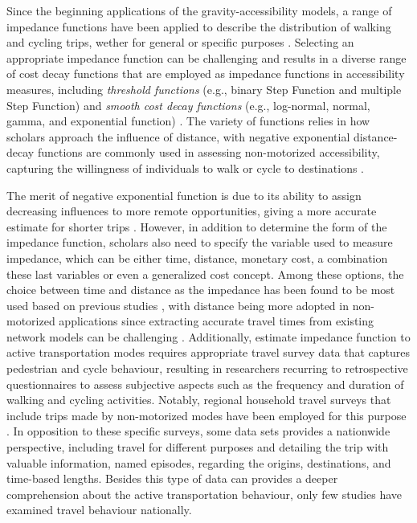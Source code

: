 \documentclass[preprint, 3p,
authoryear]{elsarticle} %
\begin{document}
Since the beginning applications of the gravity-accessibility models, a
range of impedance functions have been applied to describe the
distribution of walking and cycling trips, wether for general or
specific purposes
\citep{iacono2008access, iacono2010, larsen2010beyond, yang2012walking, millward2013active, vale2017influence, li2020approach}.
Selecting an appropriate impedance function can be challenging and
results in a diverse range of cost decay functions that are employed as
impedance functions in accessibility measures, including \emph{threshold
functions} (e.g., binary Step Function and multiple Step Function) and
\emph{smooth cost decay functions} (e.g., log-normal, normal, gamma, and
exponential function)
\citep{de2009exponential, reggiani2011accessibility, osth2016new, itf2017linking}.
The variety of functions relies in how scholars approach the influence
of distance, with negative exponential distance-decay functions are
commonly used in assessing non-motorized accessibility, capturing the
willingness of individuals to walk or cycle to destinations
\citep{handy1997measuring, geurs2001accessibility, iacono2010, vega2012using, millward2013active, vale2017influence, li2020approach}.

The merit of negative exponential function is due to its ability to
assign decreasing influences to more remote opportunities, giving a more
accurate estimate for shorter trips
\citep{iacono2010, kanafani1983transportation, fotheringham1989spatial}.
However, in addition to determine the form of the impedance function,
scholars also need to specify the variable used to measure impedance,
which can be either time, distance, monetary cost, a combination these
last variables or even a generalized cost concept. Among these options,
the choice between time and distance as the impedance has been found to
be most used based on previous studies
\citep{iacono2010, hull2012accessibility, sun2012measuring, lowry2012using, vasconcelos2012evaluation},
with distance being more adopted in non-motorized applications since
extracting accurate travel times from existing network models can be
challenging
\citep{handy1997measuring, iacono2010, yang2012walking, arranz2019measuring}.
Additionally, estimate impedance function to active transportation modes
requires appropriate travel survey data that captures pedestrian and
cycle behaviour, resulting in researchers recurring to retrospective
questionnaires to assess subjective aspects such as the frequency and
duration of walking and cycling activities. Notably, regional household
travel surveys that include trips made by non-motorized modes have been
employed for this purpose \citep{iacono2010, millward2013active}. In
opposition to these specific surveys, some data sets provides a
nationwide perspective, including travel for different purposes and
detailing the trip with valuable information, named episodes, regarding
the origins, destinations, and time-based lengths. Besides this type of
data can provides a deeper comprehension about the active transportation
behaviour, only few studies have examined travel behaviour nationally.
\end{document}
